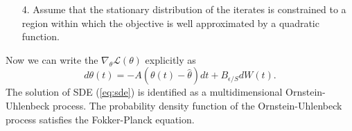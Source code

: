 \documentclass[11pt]{article}
\begin{document}
\begin{itemize}
\item[4.] Assume that the stationary distribution of the iterates is constrained to a region within which the objective is well approximated by a quadratic function. 
\end{itemize}
Now we can write the $\nabla_\theta \mathcal L (\theta)$ explicitly as 
\begin{equation}
d\theta(t) = -A(\theta(t)-\hat \theta)dt + B_{\epsilon/S} dW(t).
\label{eq:sde}
\end{equation}
The solution of SDE (\ref{eq:sde}) is identified as a multidimensional Ornstein-Uhlenbeck process. The probability density function of the Ornstein-Uhlenbeck process satisfies the Fokker-Planck equation.
\end{document}
